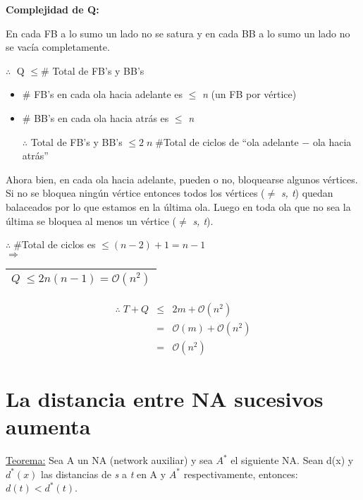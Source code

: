 \documentclass[12pt,a4paper]{report}
\newcounter{neq}
\begin{document}
		\textbf{Complejidad de Q:}

			En cada FB a lo sumo un lado no se satura y en cada BB a lo sumo un lado no se vacía completamente.

			\vspace{2mm}
			$\therefore \;$ Q $\leq \#$ Total de FB's y BB's

			\begin{itemize}
				\item $\#$ FB's en cada ola hacia adelante es $\leq$ \textit{n} (un FB por vértice)
				\item $\#$ BB's en cada ola hacia atrás es $\leq$ \textit{n}

				$\therefore$ Total de FB's y BB's $\leq 2 \; n \; \#$Total de ciclos de \textquotedblleft ola adelante $-$ ola hacia atrás\textquotedblright
 			\end{itemize}

			Ahora bien, en cada ola hacia adelante, pueden o no, bloquearse algunos vértices. Si no se bloquea ningún vértice entonces todos los vértices ($\neq$ \textit{s, t}) quedan balaceados por lo que estamos en la última ola. Luego en toda ola que no sea la última se bloquea al menos un vértice ($\neq$ \textit{s, t}).

			\begin{center}
			$\therefore \; \#$Total de ciclos es $\leq (n-2)+1 = n-1$ \\
			$\Rightarrow$ \begin{tabular}{|c|} \hline $Q \; \leq 2 n (n-1) = \mathcal{O}(n^{2})$ \\ \hline \end{tabular}
			\end{center}

			\begin{eqnarray}
				\nonumber \therefore \; T + Q & \leq & 2 m + \mathcal{O}(n^{2}) \\
				\nonumber & = & \mathcal{O}(m) + \mathcal{O}(n^{2}) \\
				\nonumber & = & \mathcal{O}(n^{2})
			\end{eqnarray}


	\section{La distancia entre NA sucesivos aumenta}

		\underline{Teorema:} Sea A un NA (network auxiliar) y sea $A^{*}$ el siguiente NA. Sean d(x) y $d^{*}(x)$ las distancias de \textit{s} a \textit{t} en A y $A^{*}$ respectivamente, entonces: $d(t) < d^{*}(t)$.
\end{document}
